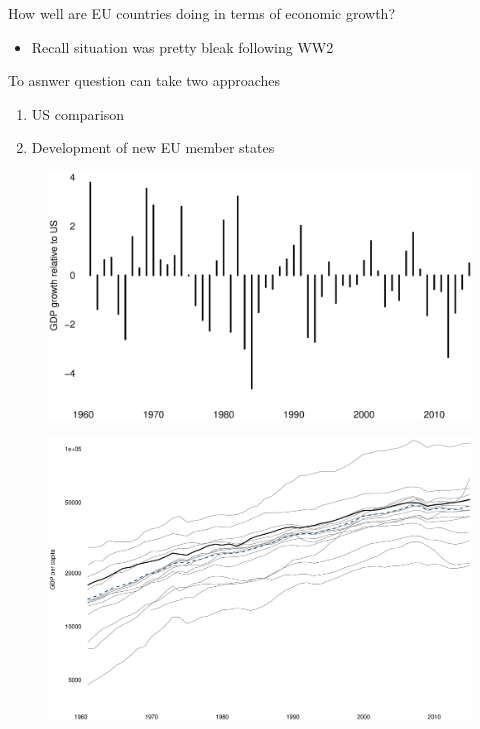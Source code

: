 \documentclass{beamer}
\begin{document}
\begin{frame}
  How well are EU countries doing in terms of economic growth?
  \begin{itemize}
    \item Recall situation was pretty bleak following WW2
  \end{itemize}
  \medskip
  To asnwer question can take two approaches  
\begin{enumerate}
  \item US comparison
  \item Development of new EU member states
\end{enumerate}
\end{frame}

\begin{frame}
  \begin{figure}
    \includegraphics[scale=.3]{versus_us.eps}
  \end{figure}
\end{frame}

\begin{frame}
  \begin{figure}
    \includegraphics[scale=.3]{versus_us2.eps}
  \end{figure}
\end{frame}
\end{document}
